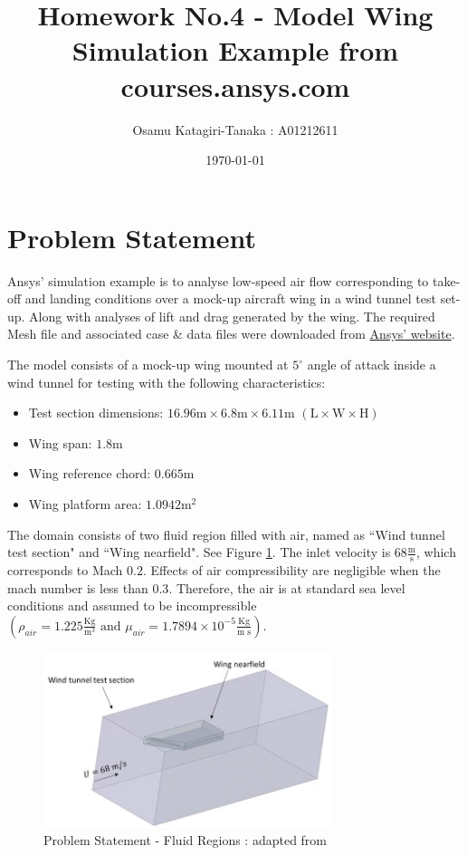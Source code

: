 \documentclass{article}
\title{Homework No.4 - Model Wing Simulation Example from courses.ansys.com}
\author{Osamu Katagiri-Tanaka : A01212611}
\date{\today}
\begin{document}
\maketitle

\section{Problem Statement}

Ansys' simulation example is to analyse low-speed air flow corresponding to take-off and landing conditions over a mock-up aircraft wing in a wind tunnel test set-up. Along with analyses of lift and drag generated by the wing. The required Mesh file and associated case \& data files were downloaded from \href{https://ansys13.ansys.com/AnsysInnovationCourses/FBU/Course%205%20-%20Dimensional%20Analysis%20and%20Similarity/Simulation%20Example%20-%20Model%20Wing/Model-Wing%20-%20Simulation%20Files.zip}{Ansys' website}. 

The model consists of a mock-up wing mounted at $5^\circ$ angle of attack inside a wind tunnel for testing with the following characteristics:

\begin{itemize}
  \item Test section dimensions: $16.96 \textrm{m} \times 6.8 \textrm{m} \times 6.11 \textrm{m}$ $(\textrm{L} \times \textrm{W} \times \textrm{H})$
  \item Wing span: $1.8 \textrm{m}$
  \item Wing reference chord: $0.665 \textrm{m}$
  \item Wing platform area: $1.0942 {\textrm{m}}^2$
\end{itemize}

The domain consists of two fluid region filled with air, named as ``Wind tunnel test section" and ``Wing nearfield". See Figure \ref{img:fluidRegions}. The inlet velocity is $\displaystyle 68 \frac{\textrm{m}}{\textrm{s}}$, which corresponds to Mach $0.2$. Effects of air compressibility are negligible when the mach number is less than $0.3$. Therefore, the air is at standard sea level conditions and assumed to be incompressible $\displaystyle \left( \rho_{air} = 1.225 \frac{\textrm{Kg}}{{\textrm{m}}^3} \textrm{ and } \mu_{air} = 1.7894 \times 10^{-5} \frac{\textrm{Kg}}{\textrm{m s}} \right)$.

\begin{figure}[h!]
	\centering
	\includegraphics[width=0.75\textwidth]{./img/fluidRegions.png}
	\caption{Problem Statement - Fluid Regions : adapted from \cite{ANSYSmodelWing}}
	\label{img:fluidRegions}
\end{figure}
\end{document}
